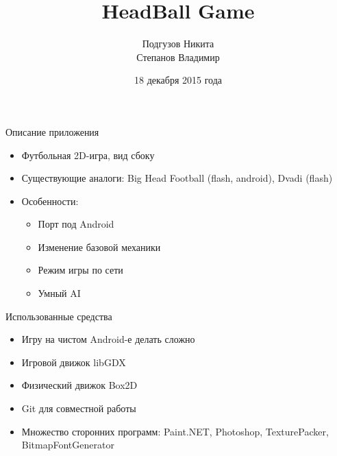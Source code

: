 \documentclass[12pt]{beamer}
\begin{document}
\title{HeadBall Game}

\author[]{
    Подгузов Никита \\
    Степанов Владимир \\
}
\date{18 декабря 2015 года}

\frame{\titlepage}

\begin{frame}{Описание приложения}

    \begin{itemize}

        \item <1-> Футбольная 2D-игра, вид сбоку
        
        \item <2-> Существующие аналоги: Big Head Football (flash, android), Dvadi (flash)

        \item <3-> Особенности: 
        
        \begin{itemize}
            \item Порт под Android
            
            \item Изменение базовой механики
            
            \item Режим игры по сети

            \item Умный AI

        \end{itemize}

    \end{itemize}

\end{frame}

\begin{frame}{Использованные средства}

    \begin{itemize}

        \item <1-> Игру на чистом Android-е делать сложно

        \item <2-> Игровой движок libGDX

        \item <3-> Физический движок Box2D

        \item <4-> Git для совместной работы

        \item <5-> Множество сторонних программ: Paint.NET, Photoshop, TexturePacker, BitmapFontGenerator

    \end{itemize}

\end{frame}
\end{document}
